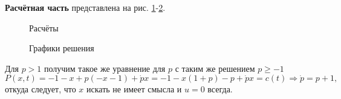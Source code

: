 \documentclass[a4paper, 12pt]{article}
\begin{document}
{\bf Расчётная часть} представлена на рис. \ref{61beg}-\ref{61end}.
\begin{figure}[h]
    \noindent{}
    \caption{Расчёты}
    \label{61beg}
\end{figure}
\begin{figure}[h]
    \noindent{}
    \caption{Графики решения}
    \label{61end}
\end{figure} 

Для $p>1$ получим такое же уравнение для $p$ с таким же решением $p \geq -1$
\begin{equation}
    P(x,t)=-1-x +p(-x-1)+\dot p x=-1 -x(1+p)-p+\dot p x=c(t) \Rightarrow \dot p=p+1,
\end{equation}
откуда следует, что $x$ искать не имеет смысла и $u=0$ всегда.
\end{document}
